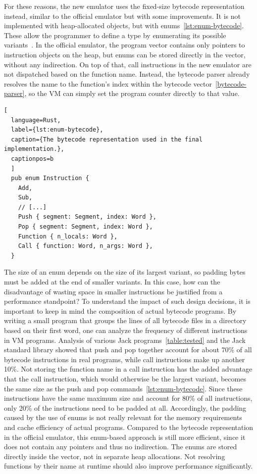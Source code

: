For these reasons, the new emulator uses the fixed-size bytecode representation instead, similar to the official emulator but with some improvements.
It is not implemented with heap-allocated objects, but with enums~\ref{lst:enum-bytecode}.
These allow the programmer to define a type by enumerating its possible variants~\cite[Chapter~6]{klabnik2019rust}.
In the official emulator, the program vector contains only pointers to instruction objects on the heap, but enums can be stored directly in the vector, without any indirection.
On top of that, call instructions in the new emulator are not dispatched based on the function name.
Instead, the bytecode parser already resolves the name to the function's index within the bytecode vector~\ref{bytecode-parser}, so the VM can simply set the program counter directly to that value.
\begin{lstlisting}[
  language=Rust,
  label={lst:enum-bytecode},
  caption={The bytecode representation used in the final implementation.},
  captionpos=b
  ]
  pub enum Instruction {
    Add,
    Sub,
    // [...]
    Push { segment: Segment, index: Word },
    Pop { segment: Segment, index: Word },
    Function { n_locals: Word },
    Call { function: Word, n_args: Word },
  }
\end{lstlisting}
The size of an enum depends on the size of its largest variant, so padding bytes must be added at the end of smaller variants.
In this case, how can the disadvantage of wasting space in smaller instructions be justified from a performance standpoint?
To understand the impact of such design decisions, it is important to keep in mind the composition of actual bytecode programs.
By writing a small program that groups the lines of all bytecode files in a directory based on their first word, one can analyze the frequency of different instructions in VM programs.
Analysis of various Jack programs~\ref{table:tested} and the Jack standard library showed that push and pop together account for about 70\% of all bytecode instructions in real programs, while call instructions make up another 10\%.
Not storing the function name in a call instruction has the added advantage that the call instruction, which would otherwise be the largest variant, becomes the same size as the push and pop commands~\ref{lst:enum-bytecode}.
Since these instructions have the same maximum size and account for 80\% of all instructions, only 20\% of the instructions need to be padded at all.
Accordingly, the padding caused by the use of enums is not really relevant for the memory requirements and cache efficiency of actual programs.
Compared to the bytecode representation in the official emulator, this enum-based approach is still more efficient, since it does not contain any pointers and thus no indirection.
The enums are stored directly inside the vector, not in separate heap allocations.
Not resolving functions by their name at runtime should also improve performance significantly.

